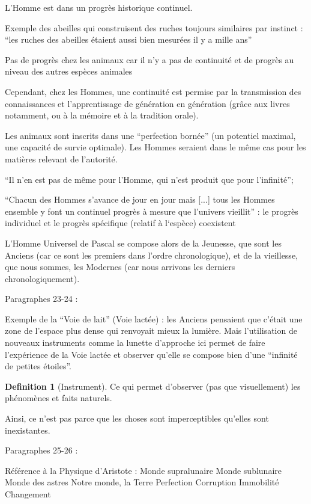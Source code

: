 \documentclass[french]{book}
\theoremstyle{definition}
\newtheorem*{dfn}{Definition}
\begin{document}
L’Homme est dans un progrès historique continuel.

Exemple des abeilles qui construisent des ruches toujours similaires par instinct : “les ruches des abeilles étaient aussi bien mesurées il y a mille ans”

Pas de progrès chez les animaux car il n’y a pas de continuité et de progrès au niveau des autres espèces animales

Cependant, chez les Hommes, une continuité est permise par la transmission des connaissances et l’apprentissage de génération en génération (grâce aux livres notamment, ou à la mémoire et à la tradition orale).

Les animaux sont inscrits dans une “perfection bornée” (un potentiel maximal, une capacité de survie optimale). Les Hommes seraient dans le même cas pour les matières relevant de l’autorité. 

“Il n’en est pas de même pour l’Homme, qui n’est produit que pour l’infinité”;

“Chacun des Hommes s'avance de jour en jour mais [...] tous les Hommes ensemble y font un continuel progrès à mesure que l’univers vieillit” : le progrès individuel et le progrès spécifique (relatif à l‘espèce) coexistent

L’Homme Universel de Pascal se compose alors de la Jeunesse, que sont les Anciens (car ce sont les premiers dans l’ordre chronologique), et de la vieillesse, que nous sommes, les Modernes (car nous arrivons les derniers chronologiquement).

Paragraphes 23-24 :

Exemple de la “Voie de lait” (Voie lactée) : les Anciens pensaient que c’était une zone de l’espace plus dense qui renvoyait mieux la lumière. Mais l’utilisation de nouveaux instruments comme la lunette d’approche ici permet de faire l’expérience de la Voie lactée et observer qu’elle se compose bien d’une “infinité de petites étoiles”.

\begin{dfn}[Instrument]
Ce qui permet d'observer (pas que visuellement) les phénomènes et faits naturels.
\end{dfn}


Ainsi, ce n’est pas parce que les choses sont imperceptibles qu’elles sont inexistantes.

Paragraphes 25-26 :

Référence à la Physique d’Aristote :
Monde supralunaire
Monde sublunaire
Monde des astres
Notre monde, la Terre
Perfection
Corruption
Immobilité
Changement
\end{document}
